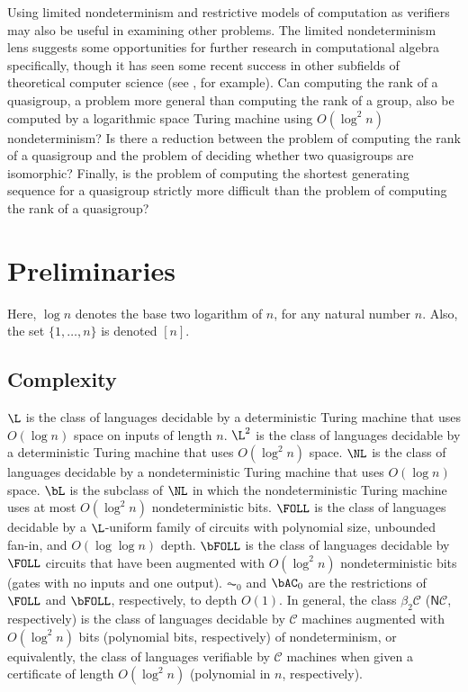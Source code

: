 \documentclass{article}
\begin{document}

Using limited nondeterminism and restrictive models of computation as verifiers may also be useful in examining other problems.
The limited nondeterminism lens suggests some opportunities for further research in computational algebra specifically, though it has seen some recent success in other subfields of theoretical computer science (see \autocite{gottlob13}, for example).
Can computing the rank of a quasigroup, a problem more general than computing the rank of a group, also be computed by a logarithmic space Turing machine using $O(\log^2 n)$ nondeterminism?
Is there a reduction between the problem of computing the rank of a quasigroup and the problem of deciding whether two quasigroups are isomorphic?
Finally, is the problem of computing the shortest generating sequence for a quasigroup strictly more difficult than the problem of computing the rank of a quasigroup?

\section{Preliminaries}

Here, $\log n$ denotes the base two logarithm of $n$, for any natural number $n$.
Also, the set $\{1, \dotsc, n\}$ is denoted $[n]$.

\subsection{Complexity}

$\L$ is the class of languages decidable by a deterministic Turing machine that uses $O(\log n)$ space on inputs of length $n$.
$\L^2$ is the class of languages decidable by a deterministic Turing machine that uses $O(\log^2 n)$ space.
$\NL$ is the class of languages decidable by a nondeterministic Turing machine that uses $O(\log n)$ space.
$\bL$ is the subclass of $\NL$ in which the nondeterministic Turing machine uses at most $O(\log^2 n)$ nondeterministic bits.
$\FOLL$ is the class of languages decidable by a $\L$-uniform family of circuits with polynomial size, unbounded fan-in, and $O(\log \log n)$ depth.
$\bFOLL$ is the class of languages decidable by $\FOLL$ circuits that have been augmented with $O(\log^2 n)$ nondeterministic bits (gates with no inputs and one output).
$\AC_0$ and $\bAC_0$ are the restrictions of $\FOLL$ and $\bFOLL$, respectively, to depth $O(1)$.
In general, the class $\beta_2 \mathcal{C}$ ($\mathsf{N} \mathcal{C}$, respectively) is the class of languages decidable by $\mathcal{C}$ machines augmented with $O(\log^2 n)$ bits (polynomial bits, respectively) of nondeterminism, or equivalently, the class of languages verifiable by $\mathcal{C}$ machines when given a certificate of length $O(\log^2 n)$ (polynomial in $n$, respectively).
\end{document}

